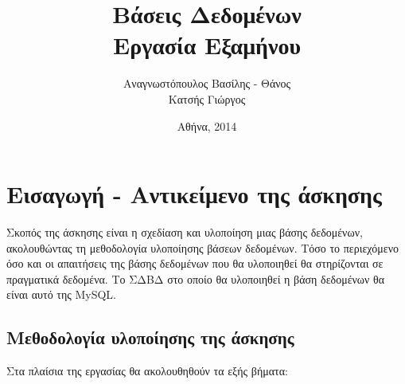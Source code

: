 \documentclass{assignment}
\title{Βάσεις Δεδομένων \\ Εργασία Εξαμήνου}
\date{Αθήνα, 2014}
\author{Αναγνωστόπουλος Βασίλης - Θάνος \\ Κατσής Γιώργος}
\begin{document}
\maketitle

\setcounter{page}{1} 

\pagestyle{plain}
\tableofcontents
\newpage


\setcounter{page}{1} 

\section{Εισαγωγή - Αντικείμενο της άσκησης}

Σκοπός της άσκησης είναι η σχεδίαση και υλοποίηση μιας βάσης δεδομένων,
ακολουθώντας τη μεθοδολογία υλοποίησης βάσεων δεδομένων. Τόσο το περιεχόμενο όσο και οι απαιτήσεις της βάσης δεδομένων που θα
υλοποιηθεί θα στηρίζονται σε πραγματικά δεδομένα. Το ΣΔΒΔ στο οποίο θα υλοποιηθεί η βάση δεδομένων θα είναι αυτό της MySQL.

\subsection{Μεθοδολογία υλοποίησης της άσκησης}

Στα πλαίσια της εργασίας θα ακολουθηθούν τα εξής βήματα:
\end{document}

